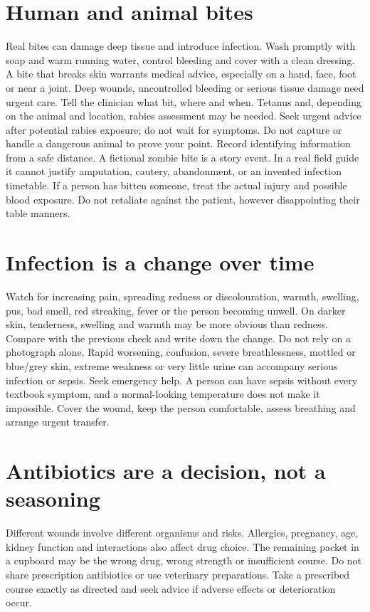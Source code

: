 \documentclass[10pt,openright]{book}
\begin{document}
\section*{Human and animal bites}
Real bites can damage deep tissue and introduce infection. Wash promptly with soap and warm running water, control bleeding and cover with a clean dressing. A bite that breaks skin warrants medical advice, especially on a hand, face, foot or near a joint. Deep wounds, uncontrolled bleeding or serious tissue damage need urgent care. Tell the clinician what bit, where and when. Tetanus and, depending on the animal and location, rabies assessment may be needed. Seek urgent advice after potential rabies exposure; do not wait for symptoms. Do not capture or handle a dangerous animal to prove your point. Record identifying information from a safe distance. A fictional zombie bite is a story event. In a real field guide it cannot justify amputation, cautery, abandonment, or an invented infection timetable. If a person has bitten someone, treat the actual injury and possible blood exposure. Do not retaliate against the patient, however disappointing their table manners.

\section*{Infection is a change over time}
Watch for increasing pain, spreading redness or discolouration, warmth, swelling, pus, bad smell, red streaking, fever or the person becoming unwell. On darker skin, tenderness, swelling and warmth may be more obvious than redness. Compare with the previous check and write down the change. Do not rely on a photograph alone. Rapid worsening, confusion, severe breathlessness, mottled or blue/grey skin, extreme weakness or very little urine can accompany serious infection or sepsis. Seek emergency help. A person can have sepsis without every textbook symptom, and a normal-looking temperature does not make it impossible. Cover the wound, keep the person comfortable, assess breathing and arrange urgent transfer.

\section*{Antibiotics are a decision, not a seasoning}
Different wounds involve different organisms and risks. Allergies, pregnancy, age, kidney function and interactions also affect drug choice. The remaining packet in a cupboard may be the wrong drug, wrong strength or insufficient course. Do not share prescription antibiotics or use veterinary preparations. Take a prescribed course exactly as directed and seek advice if adverse effects or deterioration occur.
\end{document}
